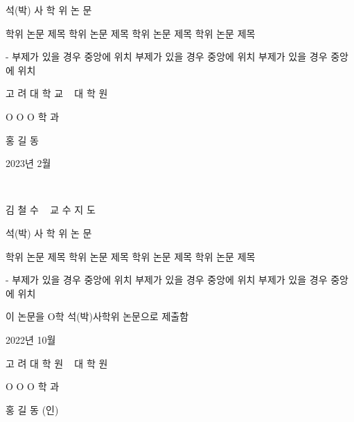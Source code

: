 \documentclass[11pt]{report}
\numberwithin{figure}{chapter}
\begin{document}
\onehalfspacing
\renewcommand{\arraystretch}{1.5}

\newpage
\centering
{} %
\Large 석(박) 사 학 위 논 문
\par\vspace{3cm} %
\huge 학위 논문 제목  학위 논문 제목   학위 논문 제목  학위 논문 제목 
\par\vspace{0.3cm}\Large - 부제가 있을 경우 중앙에 위치 부제가 있을 경우 중앙에 위치 부제가 있을 경우 중앙에 위치
\par\vspace{4.5cm} %
\LARGE 고 려 대 학 교 ~ 대 학 원
\par\vspace{0.5cm}
\Large O O O 학 과
\par\vspace{0.5cm}
\Large 홍 길 동
\par\vspace{3cm}
\large 2023년 2월 %

\newpage
~

\newpage
\Large 김 철 수 ~ 교 수 지 도
\par\vspace{0.5cm}
\Large 석(박) 사 학 위 논 문
\par\vspace{2cm}
\huge 학위 논문 제목 학위 논문 제목 학위 논문 제목 학위 논문 제목
\par\vspace{0.3cm}\Large - 부제가 있을 경우 중앙에 위치 부제가 있을 경우 중앙에 위치 부제가 있을 경우 중앙에 위치
\par\vspace{2cm} %
\Large 이 논문을 O학 석(박)사학위 논문으로 제출함
\par\vspace{2cm} %
\large 2022년 10월 %
\par\vspace{2cm} %
\LARGE 고 려 대 학 원 ~ 대 학 원
\par\vspace{0.5cm}
\Large O O O 학 과
\par\vspace{1cm}
\Large 홍 길 동 (인)
\end{document}
